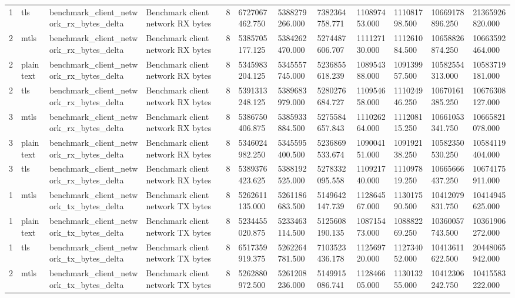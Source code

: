 \begin{longtable}{llllllllllll}
1 & tls & benchmark\_client\_network\_rx\_bytes\_delta & Benchmark client network RX bytes & 8 & 6727067462.750 & 5388279266.000 & 7382364758.771 & 110897453.000 & 111081798.500 & 10669178896.250 & 21365926820.000 \\
2 & mtls & benchmark\_client\_network\_rx\_bytes\_delta & Benchmark client network RX bytes & 8 & 5385705177.125 & 5384262470.000 & 5274487606.707 & 111127130.000 & 111261084.500 & 10658826874.250 & 10663592464.000 \\
2 & plaintext & benchmark\_client\_network\_rx\_bytes\_delta & Benchmark client network RX bytes & 8 & 5345983204.125 & 5345557745.000 & 5236855618.239 & 108954388.000 & 109139957.500 & 10582554313.000 & 10583719181.000 \\
2 & tls & benchmark\_client\_network\_rx\_bytes\_delta & Benchmark client network RX bytes & 8 & 5391313248.125 & 5389683979.000 & 5280276684.727 & 110954658.000 & 111024946.250 & 10670161385.250 & 10676308127.000 \\
3 & mtls & benchmark\_client\_network\_rx\_bytes\_delta & Benchmark client network RX bytes & 8 & 5386750406.875 & 5385933884.500 & 5275584657.843 & 111026264.000 & 111208115.250 & 10661053341.750 & 10665821078.000 \\
3 & plaintext & benchmark\_client\_network\_rx\_bytes\_delta & Benchmark client network RX bytes & 8 & 5346024982.250 & 5345595400.500 & 5236869533.674 & 109004151.000 & 109192138.250 & 10582350530.250 & 10584119404.000 \\
3 & tls & benchmark\_client\_network\_rx\_bytes\_delta & Benchmark client network RX bytes & 8 & 5389376423.625 & 5388192525.000 & 5278332095.558 & 110921740.000 & 111097819.250 & 10665666437.250 & 10674175911.000 \\
1 & mtls & benchmark\_client\_network\_tx\_bytes\_delta & Benchmark client network TX bytes & 8 & 5262611135.000 & 5261186683.500 & 5149642147.739 & 112864567.000 & 113017590.500 & 10412079831.750 & 10414945625.000 \\
1 & plaintext & benchmark\_client\_network\_tx\_bytes\_delta & Benchmark client network TX bytes & 8 & 5234455020.875 & 5233463114.500 & 5125608190.135 & 108715473.000 & 108882269.250 & 10360057743.500 & 10361906272.000 \\
1 & tls & benchmark\_client\_network\_tx\_bytes\_delta & Benchmark client network TX bytes & 8 & 6517359919.375 & 5262264781.500 & 7103523436.178 & 112569720.000 & 112734052.000 & 10413611622.500 & 20448065942.000 \\
2 & mtls & benchmark\_client\_network\_tx\_bytes\_delta & Benchmark client network TX bytes & 8 & 5262880972.500 & 5261208236.000 & 5149915086.741 & 112846605.000 & 113013255.000 & 10412306242.750 & 10415583222.000 \\

\end{longtable}
